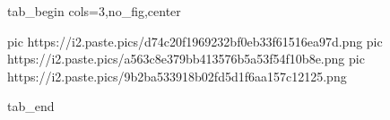  
 
 
 
 


\ifcmt
  tab_begin cols=3,no_fig,center

     pic https://i2.paste.pics/d74c20f1969232bf0eb33f61516ea97d.png
     pic https://i2.paste.pics/a563c8e379bb413576b5a53f54f10b8e.png
     pic https://i2.paste.pics/9b2ba533918b02fd5d1f6aa157c12125.png

  tab_end
\fi

